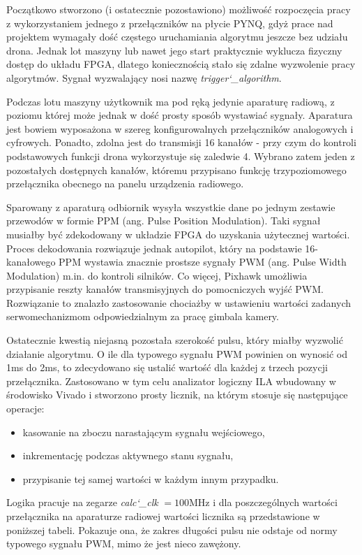 Początkowo stworzono (i ostatecznie pozostawiono) możliwość rozpoczęcia pracy z wykorzystaniem jednego z przełączników na płycie PYNQ, gdyż prace nad projektem wymagały dość częstego uruchamiania algorytmu jeszcze bez udziału drona. Jednak lot maszyny lub nawet jego start praktycznie wyklucza fizyczny dostęp do układu FPGA, dlatego koniecznością stało się zdalne wyzwolenie pracy algorytmów. Sygnał wyzwalający nosi nazwę \textit{trigger\char`_algorithm}.

Podczas lotu maszyny użytkownik ma pod ręką jedynie aparaturę radiową, z poziomu której może jednak w dość prosty sposób wystawiać sygnały. Aparatura jest bowiem wyposażona w szereg konfigurowalnych przełączników analogowych i cyfrowych. Ponadto, zdolna jest do transmisji 16 kanałów - przy czym do kontroli podstawowych funkcji drona wykorzystuje się zaledwie 4. Wybrano zatem jeden z pozostałych dostępnych kanałów, któremu przypisano funkcję trzypoziomowego przełącznika obecnego na panelu urządzenia radiowego.

Sparowany z aparaturą odbiornik wysyła wszystkie dane po jednym zestawie przewodów w formie PPM (ang. Pulse Position Modulation). Taki sygnał musiałby być zdekodowany w układzie FPGA do uzyskania użytecznej wartości. Proces dekodowania rozwiązuje jednak autopilot, który na podstawie 16-kanałowego PPM wystawia znacznie prostsze sygnały PWM (ang. Pulse Width Modulation) m.in. do kontroli silników. Co więcej, Pixhawk umożliwia przypisanie reszty kanałów transmisyjnych do pomocniczych wyjść PWM. Rozwiązanie to znalazło zastosowanie chociażby w ustawieniu wartości zadanych serwomechanizmom odpowiedzialnym za pracę gimbala kamery.

Ostatecznie kwestią niejasną pozostała szerokość pulsu, który miałby wyzwolić działanie algorytmu. O ile dla typowego sygnału PWM powinien on wynosić od 1ms do 2ms, to zdecydowano się ustalić wartość dla każdej z trzech pozycji przełącznika. Zastosowano w tym celu analizator logiczny ILA wbudowany w środowisko Vivado i stworzono prosty licznik, na którym stosuje się następujące operacje:
\begin{itemize}
	\item kasowanie na zboczu narastającym sygnału wejściowego,
	\item inkrementację podczas aktywnego stanu sygnału,
	\item przypisanie tej samej wartości w każdym innym przypadku.
\end{itemize}

Logika pracuje na zegarze \textit{calc\char`_clk} $=100$MHz i dla poszczególnych wartości przełącznika na aparaturze radiowej wartości licznika są przedstawione w poniższej tabeli. Pokazuje ona, że zakres długości pulsu nie odstaje od normy typowego sygnału PWM, mimo że jest nieco zawężony.

